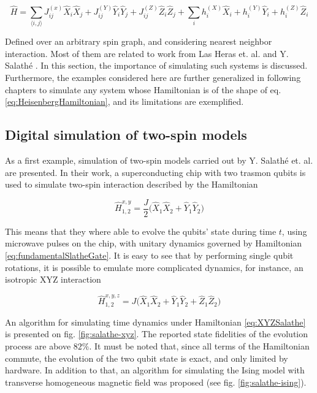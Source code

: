   \begin{equation}
    \hat{H} = \sum_{\langle i,j \rangle} J_{ij}^{(x)} \hat{X}_i \hat{X}_j + J_{ij}^{(Y)} \hat{Y}_i \hat{Y}_j + J_{ij}^{(Z)} \hat{Z}_i \hat{Z}_j + \sum_i h_i^{(X)} \hat{X}_i + h_i^{(Y)} \hat{Y}_i + h_i^{(Z)} \hat{Z}_i
    \label{eq:HeisenbergHamiltonian}
  \end{equation}

  Defined over an arbitrary spin graph, and considering nearest neighbor interaction. Most of them are related to work from Las Heras et. al. \cite{HubbardSimul,HubbardSimulLasHeras} and Y. Salathé \cite{HeisenbergSimulLasHeras}. In this section, the importance of simulating such systems is discussed. Furthermore, the examples considered here are further generalized in following chapters to simulate any system whose Hamiltonian is of the shape of eq. \ref{eq:HeisenbergHamiltonian}, and its limitations are exemplified.

  \subsection{Digital simulation of two-spin models}

  As a first example, simulation of two-spin models carried out by Y. Salathé et. al. \cite{HeisenbergSimulLasHeras} are presented. In their work, a superconducting chip with two trasmon qubits is used to simulate two-spin interaction described by the Hamiltonian

  \begin{equation}
    \hat{H}_{1,2}^{x,y} = \frac{J}{2} \bigg( \hat{X}_1 \hat{X}_2 + \hat{Y}_1 \hat{Y}_2 \bigg)
    \label{eq:fundamentalSlatheGate}
  \end{equation}

  This means that they where able to evolve the qubits' state during time $t$, using microwave pulses on the chip, with unitary dynamics governed by Hamiltonian \ref{eq:fundamentalSlatheGate}. It is easy to see that by performing single qubit rotations, it is possible to emulate more complicated dynamics, for instance, an isotropic XYZ interaction

  \begin{equation}
    \hat{H}_{1,2}^{x,y,z} = J \bigg( \hat{X}_1 \hat{X}_2 + \hat{Y}_1 \hat{Y}_2 + \hat{Z}_1 \hat{Z}_2 \bigg)
    \label{eq:XYZSalathe}
  \end{equation}

  An algorithm for simulating time dynamics under Hamiltonian \ref{eq:XYZSalathe} is presented on fig. \ref{fig:salathe-xyz}. The reported state fidelities of the evolution process are above $82\%$. It must be noted that, since all terms of the Hamiltonian commute, the evolution of the two qubit state is exact, and only limited by hardware. In addition to that, an algorithm for simulating the Ising model with transverse homogeneous magnetic field was proposed (see fig. \ref{fig:salathe-ising}).
  
